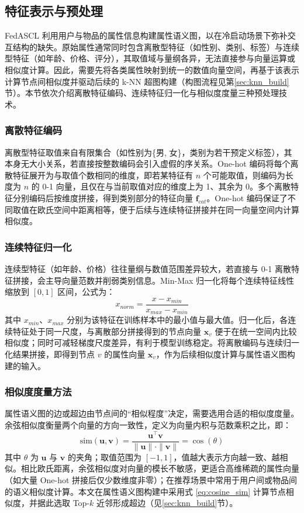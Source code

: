 \subsection{特征表示与预处理}

FedASCL 利用用户与物品的属性信息构建属性语义图，以在冷启动场景下弥补交互结构的缺失。原始属性通常同时包含离散型特征（如性别、类别、标签）与连续型特征（如年龄、价格、评分），其取值域与量纲各异，无法直接参与向量运算或相似度计算。因此，需要先将各类属性映射到统一的数值向量空间，再基于该表示计算节点间相似度并驱动后续的 k-NN 超图构建（构图流程见第\ref{sec:knn_build}节）。本节依次介绍离散特征编码、连续特征归一化与相似度度量三种预处理技术。

\subsubsection{离散特征编码}
离散型特征取值来自有限集合（如性别为\{男, 女\}，类别为若干预定义标签），其本身无大小关系，若直接按整数编码会引入虚假的序关系。One-hot 编码将每个离散特征展开为与取值个数相同的维度，即若某特征有 $n$ 个可能取值，则编码为长度为 $n$ 的 0-1 向量，且仅在与当前取值对应的维度上为 1、其余为 0。多个离散特征分别编码后按维度拼接，得到类别部分的特征向量 $\mathbf{f}_{cat}$。One-hot 编码保证了不同取值在欧氏空间中距离相等，便于后续与连续特征拼接并在同一向量空间内计算相似度。

\subsubsection{连续特征归一化}
连续型特征（如年龄、价格）往往量纲与数值范围差异较大，若直接与 0-1 离散特征拼接，会主导向量范数并削弱类别信息。Min-Max 归一化将每个连续特征线性缩放到 $[0,1]$ 区间，公式为：
    \begin{equation}
    x_{norm} = \frac{x - x_{min}}{x_{max} - x_{min}}
    \label{eq:minmax}
    \end{equation}
其中 $x_{min}$、$x_{max}$ 分别为该特征在训练样本中的最小值与最大值。归一化后，各连续特征处于同一尺度，与离散部分拼接得到的节点向量 $\mathbf{x}_v$ 便于在统一空间内比较相似度；同时可减轻梯度尺度差异，有利于模型训练稳定。将离散编码与连续归一化结果拼接，即得到节点 $v$ 的属性向量 $\mathbf{x}_v$，作为后续相似度计算与属性语义图构建的输入。

\subsubsection{相似度度量方法}
属性语义图的边或超边由节点间的“相似程度”决定，需要选用合适的相似度度量。余弦相似度衡量两个向量的方向一致性，定义为向量内积与范数乘积之比，即：
\begin{equation}
    \text{sim}(\mathbf{u}, \mathbf{v}) = \frac{\mathbf{u}^\top \mathbf{v}}{\|\mathbf{u}\| \cdot \|\mathbf{v}\|} = \cos(\theta)
    \label{eq:cosine_sim}
\end{equation}
其中 $\theta$ 为 $\mathbf{u}$ 与 $\mathbf{v}$ 的夹角；取值范围为 $[-1, 1]$，值越大表示方向越一致、越相似。相比欧氏距离，余弦相似度对向量的模长不敏感，更适合高维稀疏的属性向量（如大量 One-hot 拼接后仅少数维度非零）；在推荐场景中常用于用户间或物品间的语义相似度计算。本文在属性语义图构建中采用式 \eqref{eq:cosine_sim} 计算节点相似度，并据此选取 Top-$k$ 近邻形成超边（见\ref{sec:knn_build}节）。

